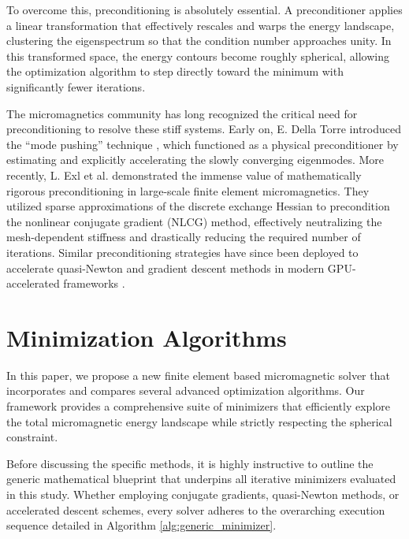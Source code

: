 \documentclass[10pt, a4paper, twocolumn]{article}
\begin{document}
To overcome this, preconditioning is absolutely essential. A preconditioner applies a linear transformation that effectively rescales and warps the energy landscape, clustering the eigenspectrum so that the condition number approaches unity. In this transformed space, the energy contours become roughly spherical, allowing the optimization algorithm to step directly toward the minimum with significantly fewer iterations. 

The micromagnetics community has long recognized the critical need for preconditioning to resolve these stiff systems. Early on, E. Della Torre introduced the ``mode pushing'' technique \cite{TorfehIsfahani1983}, which functioned as a physical preconditioner by estimating and explicitly accelerating the slowly converging eigenmodes. More recently, L. Exl et al. \cite{Exl2014} demonstrated the immense value of mathematically rigorous preconditioning in large-scale finite element micromagnetics. They utilized sparse approximations of the discrete exchange Hessian to precondition the nonlinear conjugate gradient (NLCG) method, effectively neutralizing the mesh-dependent stiffness and drastically reducing the required number of iterations. Similar preconditioning strategies have since been deployed to accelerate quasi-Newton and gradient descent methods in modern GPU-accelerated frameworks \cite{Chang2011}.

\section{Minimization Algorithms}
In this paper, we propose a new finite element based micromagnetic solver that incorporates and compares several advanced optimization algorithms. Our framework provides a comprehensive suite of minimizers that efficiently explore the total micromagnetic energy landscape while strictly respecting the spherical constraint. 

Before discussing the specific methods, it is highly instructive to outline the generic mathematical blueprint that underpins all iterative minimizers evaluated in this study. Whether employing conjugate gradients, quasi-Newton methods, or accelerated descent schemes, every solver adheres to the overarching execution sequence detailed in Algorithm \ref{alg:generic_minimizer}. 
\end{document}

